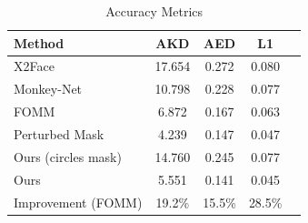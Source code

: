 \documentclass{article}
\begin{document}
\begin{table}[t]
\caption{Accuracy Metrics}
\label{table:results}
\vskip 0.15in
\begin{center}
\begin{small}
\begin{sc}
\begin{tabular}{lcccr}
\toprule
Method & AKD & AED & L1 \\
\midrule
X2Face    & 17.654 & 0.272 & 0.080 \\
Monkey-Net    & 10.798 & 0.228 & 0.077 \\
FOMM    & 6.872 & 0.167 & 0.063 \\
Perturbed Mask & 4.239 & 0.147 & 0.047 \\
Ours (circles mask) & 14.760& 0.245 & 0.077 \\
Ours & 5.551 & 0.141 &  0.045\\
\midrule
Improvement (FOMM)    & 19.2\% & 15.5\% & 28.5\% \\
\bottomrule
\end{tabular}
\end{sc}
\end{small}
\end{center}
\vskip -0.1in
\end{table}
\end{document}
